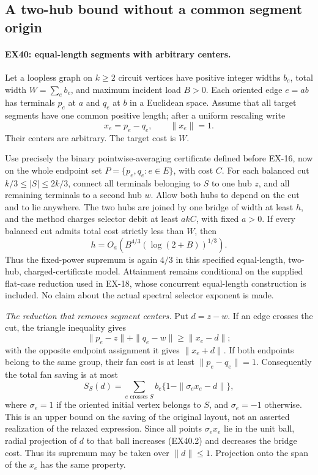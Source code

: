 \subsection{A two-hub bound without a common segment origin}
\label{sec:ex-nonconcurrent-twohub}

\paragraph{EX40: equal-length segments with arbitrary centers.}
Let a loopless graph on $k\ge2$ circuit vertices have positive integer
widths $b_e$, total width $W=\sum_e b_e$, and maximum incident load
$B>0$. Each oriented edge $e=ab$ has terminals $p_e$ at $a$ and
$q_e$ at $b$ in a Euclidean space. Assume that all target segments
have one common positive length; after a uniform rescaling write
\[
 x_e=p_e-q_e,\qquad \|x_e\|=1.
\]
Their centers are arbitrary. The target cost is $W$.

Use precisely the binary pointwise-averaging certificate defined
before EX-16, now on the whole endpoint set
$P=\{p_e,q_e:e\in E\}$, with cost $C$. For each balanced cut
$k/3\le |S|\le2k/3$, connect all terminals belonging to $S$ to
one hub $z$, and all remaining terminals to a second hub $w$.
Allow both hubs to depend on the cut and to lie anywhere.
The two hubs are joined by one bridge of width at least $h$,
and the method charges selector debit at least $akC$, with
fixed $a>0$. If every balanced cut admits total cost strictly
less than $W$, then
\[
 h=O_a\!\left(B^{4/3}(\log(2+B))^{1/3}\right).
 \tag{EX40.1}
\]
Thus the fixed-power supremum is again $4/3$ in this specified
equal-length, two-hub, charged-certificate model. Attainment
remains conditional on the supplied flat-case reduction used
in EX-18, whose concurrent equal-length construction is included.
No claim about the actual spectral selector exponent is made.

\emph{The reduction that removes segment centers.}
Put $d=z-w$. If an edge crosses the cut, the triangle inequality
gives
\[
 \|p_e-z\|+\|q_e-w\|\ge\|x_e-d\|;
\]
with the opposite endpoint assignment it gives $\|x_e+d\|$.
If both endpoints belong to the same group, their fan cost is
at least $\|p_e-q_e\|=1$. Consequently the total fan saving
is at most
\[
 S_S(d)=\sum_{e\text{ crosses }S}
        b_e\{1-\|\sigma_e x_e-d\|\},
 \tag{EX40.2}
\]
where $\sigma_e=1$ if the oriented initial vertex belongs to
$S$, and $\sigma_e=-1$ otherwise. This is an upper bound on
the saving of the original layout, not an asserted realization
of the relaxed expression. Since all points $\sigma_e x_e$
lie in the unit ball, radial projection of $d$ to that ball
increases (EX40.2) and decreases the bridge cost. Thus its
supremum may be taken over $\|d\|\le1$. Projection onto the
span of the $x_e$ has the same property.

